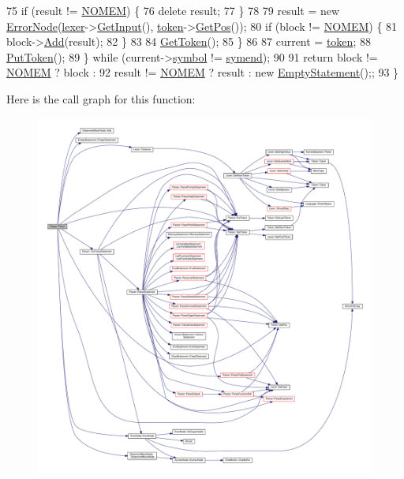 \begin{DoxyCode}
75             \textcolor{keywordflow}{if} (result != \hyperlink{platform_8h_a46ff2bfbf0d44b8466a2251d5bd5e6f8}{NOMEM}) \{
76                 \textcolor{keyword}{delete} result;
77             \}
78 
79             result = \textcolor{keyword}{new} \hyperlink{classErrorNode}{ErrorNode}(\hyperlink{classParser_a8a8214126b0b0455e3ce375f3e9b20bf}{lexer}->\hyperlink{classLexer_a3032cbeb851294bccd61b722d9a86265}{GetInput}(), 
      \hyperlink{classParser_a467028559d31c5b33f16ca8be56715cc}{token}->\hyperlink{structToken_a5f93ea94940a6eeb060507e1da594599}{GetPos}());
80             \textcolor{keywordflow}{if} (block != \hyperlink{platform_8h_a46ff2bfbf0d44b8466a2251d5bd5e6f8}{NOMEM}) \{
81                 block->\hyperlink{classStatementBlockNode_a7cdae86c013121c1fdab0ee885c2b559}{Add}(result);
82             \}
83 
84             \hyperlink{classParser_a415a103e66558b4d366d9a1420561fe3}{GetToken}();
85         \}
86 
87         current = \hyperlink{classParser_a467028559d31c5b33f16ca8be56715cc}{token};
88         \hyperlink{classParser_adb5c3a188b36f7ecb198ae30f06338b3}{PutToken}();
89     \} \textcolor{keywordflow}{while} (current->\hyperlink{structToken_aa671eaaae5632c5277e89a090d864820}{symbol} != \hyperlink{lex_8h_a7feef761cd73fac6e25b8bb80d2c4e54a9be8426421896b360944c1313abeffdb}{symend});
90 
91     \textcolor{keywordflow}{return} block != \hyperlink{platform_8h_a46ff2bfbf0d44b8466a2251d5bd5e6f8}{NOMEM} ? block :
92            result != \hyperlink{platform_8h_a46ff2bfbf0d44b8466a2251d5bd5e6f8}{NOMEM} ? result : \textcolor{keyword}{new} \hyperlink{classEmptyStatement}{EmptyStatement}();;
93 \}
\end{DoxyCode}


Here is the call graph for this function\+:
\nopagebreak
\begin{figure}[H]
\begin{center}
\leavevmode
\includegraphics[width=350pt]{d0/d40/classParser_a1861d1d9cc6165970cf07e07cacd11df_cgraph}
\end{center}
\end{figure}




